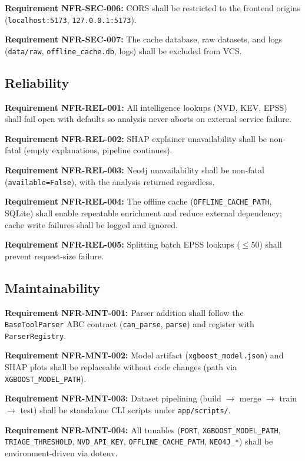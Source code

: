 \documentclass[10pt,journal,onecolumn]{IEEEtran}
\newcommand{\reqid}[1]{\textbf{#1}}
\begin{document}
\reqid{Requirement NFR-SEC-006:} CORS shall be restricted to the frontend origins (\texttt{localhost:5173}, \texttt{127.0.0.1:5173}).

\reqid{Requirement NFR-SEC-007:} The cache database, raw datasets, and logs (\texttt{data/raw}, \texttt{offline\_cache.db}, logs) shall be excluded from VCS.

\subsection{Reliability}

\reqid{Requirement NFR-REL-001:} All intelligence lookups (NVD, KEV, EPSS) shall fail open with defaults so analysis never aborts on external service failure.

\reqid{Requirement NFR-REL-002:} SHAP explainer unavailability shall be non-fatal (empty explanations, pipeline continues).

\reqid{Requirement NFR-REL-003:} Neo4j unavailability shall be non-fatal (\texttt{available=False}), with the analysis returned regardless.

\reqid{Requirement NFR-REL-004:} The offline cache (\texttt{OFFLINE\_CACHE\_PATH}, SQLite) shall enable repeatable enrichment and reduce external dependency; cache write failures shall be logged and ignored.

\reqid{Requirement NFR-REL-005:} Splitting batch EPSS lookups ($\leq$50) shall prevent request-size failure.

\subsection{Maintainability}

\reqid{Requirement NFR-MNT-001:} Parser addition shall follow the \texttt{BaseToolParser} ABC contract (\texttt{can\_parse}, \texttt{parse}) and register with \texttt{ParserRegistry}.

\reqid{Requirement NFR-MNT-002:} Model artifact (\texttt{xgboost\_model.json}) and SHAP plots shall be replaceable without code changes (path via \texttt{XGBOOST\_MODEL\_PATH}).

\reqid{Requirement NFR-MNT-003:} Dataset pipelining (build $\rightarrow$ merge $\rightarrow$ train $\rightarrow$ test) shall be standalone CLI scripts under \texttt{app/scripts/}.

\reqid{Requirement NFR-MNT-004:} All tunables (\texttt{PORT}, \texttt{XGBOOST\_MODEL\_PATH}, \texttt{TRIAGE\_THRESHOLD}, \texttt{NVD\_API\_KEY}, \texttt{OFFLINE\_CACHE\_PATH}, \texttt{NEO4J\_*}) shall be environment-driven via dotenv.
\end{document}
